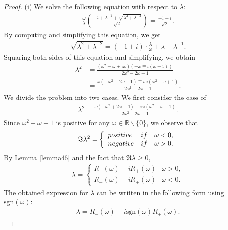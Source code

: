 \documentclass[10pt,a4paper]{amsart}
\begin{document}
\begin{proof}
($\mathrm{i}$) We solve the following equation with respect to $\lambda$:
\begin{eqnarray*}
\frac{\omega}{\lambda} \left( \frac{-\lambda + \lambda^{-1} + \sqrt{\lambda^2 + \lambda^{-2}}}{\sqrt{2}} \right) = \frac{-1 \pm i}{\sqrt{2}}. 
\end{eqnarray*}
By computing and simplifying this equation, we get
\begin{align}
    \label{413}
    \sqrt{\lambda^2+\lambda^{-2}}=(-1\pm i)\cdot \frac{\lambda}{\omega}+\lambda-\lambda^{-1}.
\end{align}
Squaring both sides of this equation and simplifying, we obtain
\begin{align*}
\lambda^2 &= \frac{(\omega^2 - \omega \pm i\omega)(-\omega \mp i(\omega -1))}{2\omega^2 -2\omega +1} \\
&= \frac{\omega (-\omega ^2 +2\omega -1) \mp i\omega (\omega ^2 -\omega +1)}{2\omega ^2 -2\omega +1}. 
 \end{align*}
We divide the problem into two cases. We first consider the case of 
\begin{align*}
\lambda ^2= \frac{\omega (-\omega ^2 +2\omega -1) - i\omega (\omega ^2 -\omega +1)}{2\omega ^2 -2\omega +1}. 
 \end{align*}
Since $\omega^2-\omega+1$ is positive for any $\omega \in \mathbb{R} \backslash \{0\}$, we observe that
\begin{eqnarray*}
\Im \lambda^2 = \left\{
\begin{array}{ll}
{\rm positive} &  {\rm if} \quad  \omega <0,\\
{\rm negative} & {\rm if} \quad \omega >0.
\end{array}
\right. 
\end{eqnarray*}
By Lemma \ref{lemma46} and the fact that $\Re \lambda \geq 0$,
\begin{eqnarray*}
\lambda = \left\{
\begin{array}{ll}
R_{-}(\omega)-iR_{+}(\omega) &   \omega >0,\\
R_{-}(\omega)+iR_{+}(\omega) &  \omega <0.
\end{array}
\right.
\end{eqnarray*}
The obtained expression for $\lambda$ can be written in the following form using $\mathrm{sgn}(\omega)$:
\begin{align*}
    \lambda = R_{-}(\omega)-i\mathrm{sgn}(\omega)R_{+}(\omega).
\end{align*}


\end{proof}
\end{document}
